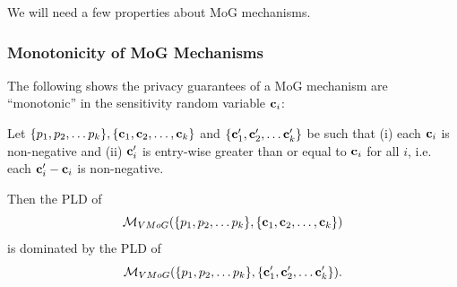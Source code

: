 We will need a few properties about MoG mechanisms. 


\subsubsection{Monotonicity of MoG Mechanisms}
The following shows the privacy guarantees of a MoG mechanism are ``monotonic'' in the sensitivity random variable $\mathbf{c}_i$:

\begin{lem}\label{lem:vectormonotonicdominance}
Let $\{p_1, p_2, \ldots p_k\}, \{\mathbf{c}_1, \mathbf{c}_2, \ldots, \mathbf{c}_k\}$ and $\{\mathbf{c}'_1, \mathbf{c}'_2, \ldots \mathbf{c}'_{k}\}$ be such that (i) each $\mathbf{c}_i$ is non-negative and (ii) $\mathbf{c}'_i$ is entry-wise greater than or equal to $\mathbf{c}_i$ for all $i$, i.e. each $\mathbf{c}'_i - \mathbf{c}_i$ is non-negative.

Then the PLD of \[\mathcal{M}_{VMoG}(\{p_1, p_2, \ldots p_k\}, \{\mathbf{c}_1, \mathbf{c}_2, \ldots, \mathbf{c}_k\})\] is dominated by the PLD of \[\mathcal{M}_{VMoG}(\{p_1, p_2, \ldots p_{k}\}, \{\mathbf{c}'_1, \mathbf{c}'_2, \ldots \mathbf{c}'_{k}\}).\]
\end{lem}
